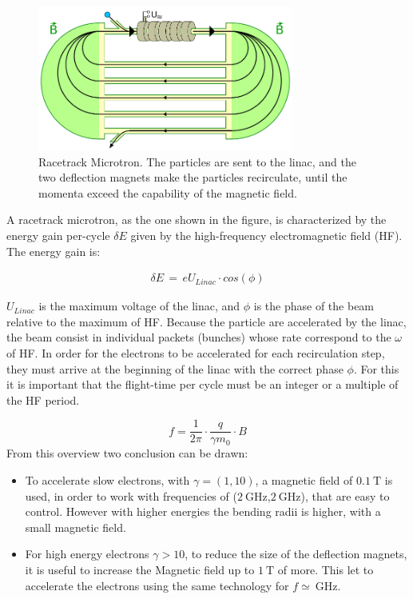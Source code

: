 \begin{figure}[hbtp]

\centering
\includegraphics[width = 0.75\textwidth]{ExperimentalSetup/RacetrackMicrotronSketch.pdf}
\caption{Racetrack Microtron. The particles are sent to the linac, and the two deflection magnets make the particles recirculate, until the momenta exceed the capability of the magnetic field.}
\end{figure}

A racetrack microtron, as the one shown in the figure, is characterized by the energy gain per-cycle $\delta E$ given by the high-frequency electromagnetic field (HF). The energy gain is: 

\begin{align*}
\delta E \, = \, e U_{Linac} \cdot cos(\phi)
\end{align*} 

$U_{Linac}$ is the maximum voltage of the linac, and $\phi$ is the phase of the beam relative to the maximum of HF. Because the particle are accelerated by the linac, the beam consist in individual packets (bunches) whose rate correspond to the $\omega$ of HF. In order for the electrons to be accelerated for each recirculation step, they must arrive at the beginning of the linac with the correct phase $\phi$. For this it is important that the flight-time per cycle must be an integer or a multiple of the HF period.

\begin{equation} \label{eq:frequency}
f = \frac{1}{2 \pi} \cdot \dfrac{q}{\gamma m_{0}} \cdot B
\end{equation}
From this overview two conclusion can be drawn:
\begin{itemize}
\item To accelerate slow electrons, with $\gamma = (1,10)$, a magnetic field of $\SI{0.1}{\tesla}$ is used, in order to work with frequencies of ($\SI{2}{\giga \hertz}$,$\SI{2}{\giga \hertz}$), that are easy to control. However with higher energies the bending radii is higher, with a small magnetic field.
\item For high energy electrons $\gamma > 10$, to reduce the size of the deflection magnets, it is useful to increase the Magnetic field up to $\SI{1}{\tesla}$ of more. This let to accelerate the electrons using the same technology for $f \simeq \SI{}{\giga \hertz}$.
\end{itemize}


